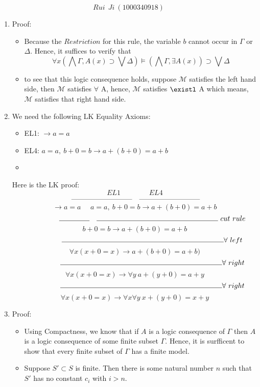 \documentclass[11pt,twoside]{article}
\begin{document}
\[Rui \ \ Ji \ (1000340918)\]
\begin{enumerate}
\item
Proof:
	\begin{itemize}[label = {}]
		\item Because the $Restriction$ for this rule, the variable $b$ cannot occur in $\Gamma$ or $\Delta$. Hence, it suffices to verify that
				\[\forall x (\bigwedge \Gamma, A(x) \supset  \bigvee \Delta) \models (\bigwedge \Gamma,  \exists A(x))\supset  \bigvee \Delta\]
		\item to see that this logic consequence holds, suppose $\mathcal {M}$ satisfies the left hand side, then  $\mathcal {M}$ satisfies $\forall$ A, hence, 
		 $\mathcal {M}$ satisfies $\existl$ A which means,  $\mathcal {M}$  satisfies that right hand side.
	\end{itemize}
\item	We need the following LK Equality Axioms:\\
	\begin{itemize}[label = {}]
	\item EL1: $\rightarrow a = a$ 
	\item EL4: $a=a, \ b + 0 = b  \rightarrow a+(b+0) = a+b$
	\item
	\end{itemize}
	Here is the LK proof:
	\[ EL1\ \ \ \ \ \ \ \ \ \ \ \ \ \  \ \ \ \ EL4\]
	\[ \ \rule{3cm}{0.4pt} \ \ \ \rule{3cm}{0.4pt}\] 
	\[ \rightarrow a = a \ \ \ \ \ \ a=a, \ b + 0 = b  \rightarrow a+(b+0) = a+b\]
	\[ \ \ \ \ \ \ \ \ \ \ \ \  \ \ \  \rule{1.5cm}{0.4pt} \ \ \ \rule{6cm}{0.4pt} \ cut \ rule\] 
	\[b+0 = b \rightarrow a+(b+0) = a+b \]
	\[\ \ \ \ \ \ \ \ \ \ \ \  \ \ \  \rule{8cm}{0.4pt} \forall \ left\]
	\[ \forall x (x+0 = x) \rightarrow a+(b+0) = a+b)\] 
	\[\ \ \ \ \ \ \ \ \ \ \ \  \ \ \  \rule{8cm}{0.4pt} \forall \ right\]
	\[ \forall x (x+0 = x) \rightarrow  \forall y \ a+(y+0) = a + y\] 
	\[\ \ \ \ \ \ \ \ \ \ \ \  \ \ \  \rule{8cm}{0.4pt} \forall \ right\]
	\[ \forall x (x+0 = x) \rightarrow  \forall x \forall y \ x+(y+0) = x + y \] 
\item Proof:
	\begin{itemize}[label = {}]
	\item Using Compactness, we know that if $A$ is a logic consequence of $\Gamma$ then $A$ is a logic consequence of some finite subset $\Gamma$. Hence, it is su rfficent to show that every finite subset of $\Gamma$ has a finite model.
	\item Suppose $S' \subset S$ is finite. Then there is some natural number $n$  such that $S'$ has no constant $c_i$ with $i > n$.

\end{itemize}
\end{enumerate}
\end{document}
